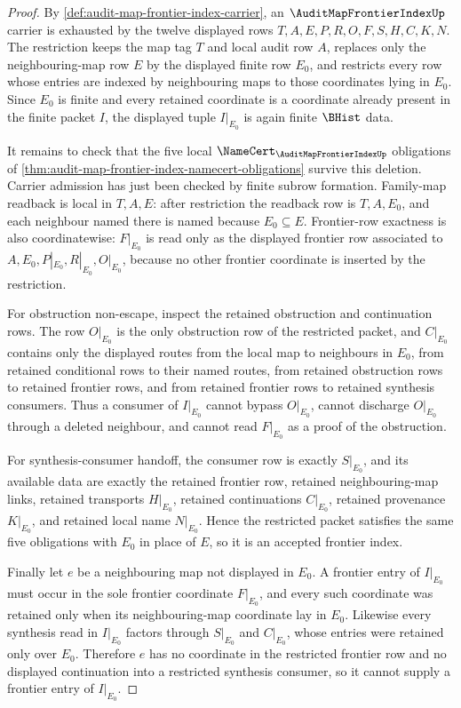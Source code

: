 \begin{proof}
By \autoref{def:audit-map-frontier-index-carrier}, an $\AuditMapFrontierIndexUp$ carrier is exhausted by the twelve displayed rows $T,A,E,P,R,O,F,S,H,C,K,N$. The restriction keeps the map tag $T$ and local audit row $A$, replaces only the neighbouring-map row $E$ by the displayed finite row $E_0$, and restricts every row whose entries are indexed by neighbouring maps to those coordinates lying in $E_0$. Since $E_0$ is finite and every retained coordinate is a coordinate already present in the finite packet $I$, the displayed tuple $I|_{E_0}$ is again finite $\BHist$ data.

It remains to check that the five local $\NameCert_{\AuditMapFrontierIndexUp}$ obligations of \autoref{thm:audit-map-frontier-index-namecert-obligations} survive this deletion. Carrier admission has just been checked by finite subrow formation. Family-map readback is local in $T,A,E$: after restriction the readback row is $T,A,E_0$, and each neighbour named there is named because $E_0\subseteq E$. Frontier-row exactness is also coordinatewise: $F|_{E_0}$ is read only as the displayed frontier row associated to $A,E_0,P|_{E_0},R|_{E_0},O|_{E_0}$, because no other frontier coordinate is inserted by the restriction.

For obstruction non-escape, inspect the retained obstruction and continuation rows. The row $O|_{E_0}$ is the only obstruction row of the restricted packet, and $C|_{E_0}$ contains only the displayed routes from the local map to neighbours in $E_0$, from retained conditional rows to their named routes, from retained obstruction rows to retained frontier rows, and from retained frontier rows to retained synthesis consumers. Thus a consumer of $I|_{E_0}$ cannot bypass $O|_{E_0}$, cannot discharge $O|_{E_0}$ through a deleted neighbour, and cannot read $F|_{E_0}$ as a proof of the obstruction.

For synthesis-consumer handoff, the consumer row is exactly $S|_{E_0}$, and its available data are exactly the retained frontier row, retained neighbouring-map links, retained transports $H|_{E_0}$, retained continuations $C|_{E_0}$, retained provenance $K|_{E_0}$, and retained local name $N|_{E_0}$. Hence the restricted packet satisfies the same five obligations with $E_0$ in place of $E$, so it is an accepted frontier index.

Finally let $e$ be a neighbouring map not displayed in $E_0$. A frontier entry of $I|_{E_0}$ must occur in the sole frontier coordinate $F|_{E_0}$, and every such coordinate was retained only when its neighbouring-map coordinate lay in $E_0$. Likewise every synthesis read in $I|_{E_0}$ factors through $S|_{E_0}$ and $C|_{E_0}$, whose entries were retained only over $E_0$. Therefore $e$ has no coordinate in the restricted frontier row and no displayed continuation into a restricted synthesis consumer, so it cannot supply a frontier entry of $I|_{E_0}$.
\end{proof}

